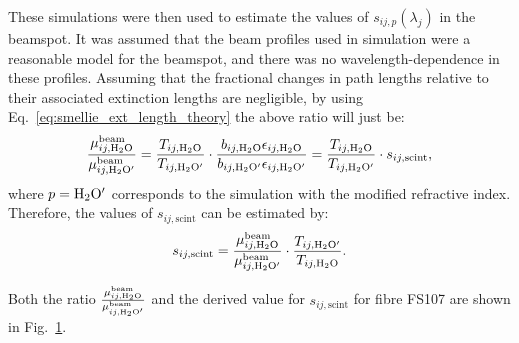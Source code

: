 \begin{figure}
    \centering
    \caption[]{}
    \label{fig:smellie_ref_index_ratio_beamspot}
\end{figure}

These simulations were then used to estimate the values of $s_{ij,p}(\lambda_{j})$ in the beamspot. It was assumed that the beam profiles used in simulation were a reasonable model for the beamspot, and there was no wavelength-dependence in these profiles. Assuming that the fractional changes in path lengths relative to their associated extinction lengths are negligible, by using Eq.~\ref{eq:smellie_ext_length_theory} the above ratio will just be:
\begin{equation}
    \frac{\mu_{ij,\ce{H_{2}O}}^{\mathrm{beam}}}{\mu_{ij,\ce{H_{2}O}'}^{\mathrm{beam}}}
    = \frac{T_{ij,\ce{H_{2}O}}}{T_{ij,\ce{H_{2}O}'}}\cdot
    \frac{b_{ij,\ce{H_{2}O}}\epsilon_{ij,\ce{H_{2}O}}}{b_{ij,\ce{H_{2}O}'}\epsilon_{ij,\ce{H_{2}O}'}}
    = \frac{T_{ij,\ce{H_{2}O}}}{T_{ij,\ce{H_{2}O}'}}\cdot s_{ij,\mathrm{scint}},
\end{equation}
where $p = \ce{H_{2}O}'$ corresponds to the simulation with the modified refractive index. Therefore, the values of $s_{ij,\mathrm{scint}}$ can be estimated by:
\begin{equation}
    s_{ij,\mathrm{scint}} = 
    \frac{\mu_{ij,\ce{H_{2}O}}^{\mathrm{beam}}}{\mu_{ij,\ce{H_{2}O}'}^{\mathrm{beam}}}
    \cdot \frac{T_{ij,\ce{H_{2}O}'}}{T_{ij,\ce{H_{2}O}}}.
\end{equation}

Both the ratio $\frac{\mu_{ij,\ce{H_{2}O}}^{\mathrm{beam}}}{\mu_{ij,\ce{H_{2}O}'}^{\mathrm{beam}}}$ and the derived value for $s_{ij,\mathrm{scint}}$ for fibre FS107 are shown in Fig.~\ref{fig:smellie_ref_index_ratio_beamspot}. %





